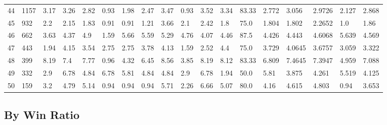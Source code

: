 \documentclass[landscape, 10pt]{report}
\begin{document}
\begin{longtable}{l || l || l | l | l | l | l | l | l | l | l | l | l || l | l | l | l | l}
44 & 1157 & 3.17 & 3.26 & 2.82 & 0.93 & 1.98 & 2.47 & 3.47 & 0.93 & 3.52 & 3.34 & 83.33 & 2.772 & 3.056 & 2.9726 & 2.127 & 2.868\\ 
\rowcolor{lightgray}45 & 932 & 2.2 & 2.15 & 1.83 & 0.91 & 0.91 & 1.21 & 3.66 & 2.1 & 2.42 & 1.8 & 75.0 & 1.804 & 1.802 & 2.2652 & 1.0 & 1.86\\ 
46 & 662 & 3.63 & 4.37 & 4.9 & 1.59 & 5.66 & 5.59 & 5.29 & 4.76 & 4.07 & 4.46 & 87.5 & 4.426 & 4.443 & 4.6068 & 5.639 & 4.569\\ 
\rowcolor{lightgray}47 & 443 & 1.94 & 4.15 & 3.54 & 2.75 & 2.75 & 3.78 & 4.13 & 1.59 & 2.52 & 4.4 & 75.0 & 3.729 & 4.0645 & 3.6757 & 3.059 & 3.322\\ 
48 & 399 & 8.19 & 7.4 & 7.77 & 0.96 & 4.32 & 6.45 & 8.56 & 3.85 & 8.19 & 8.12 & 83.33 & 6.809 & 7.4645 & 7.3947 & 4.959 & 7.088\\ 
\rowcolor{lightgray}49 & 332 & 2.9 & 6.78 & 4.84 & 6.78 & 5.81 & 4.84 & 4.84 & 2.9 & 6.78 & 1.94 & 50.0 & 5.81 & 3.875 & 4.261 & 5.519 & 4.125\\ 
50 & 159 & 3.2 & 4.79 & 5.14 & 0.94 & 0.94 & 0.94 & 5.71 & 2.26 & 6.66 & 5.07 & 80.0 & 4.16 & 4.615 & 4.803 & 0.94 & 3.653\\ 
\end{longtable} 
 
\pagebreak\subsection*{By Win Ratio} 
\end{document}
